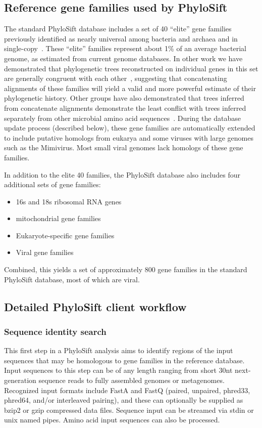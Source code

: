 \documentclass[10pt]{article}
\begin{document}
\subsection*{Reference gene families used by PhyloSift}

The standard PhyloSift database includes a set of 40 ``elite'' gene families previously identified as nearly universal among bacteria and archaea and in single-copy~\cite{DongyingWu2012}.
These ``elite'' families represent about 1\% of an average bacterial genome, as estimated from current genome databases.
In other work we have demonstrated that phylogenetic trees reconstructed on individual genes in this set are generally congruent with each other~\cite{Lang2012}, suggesting that concatenating alignments of these families will yield a valid and more powerful estimate of their phylogenetic history.
Other groups have also demonstrated that trees inferred from concatenate alignments demonstrate the least conflict with trees inferred separately from other microbial amino acid sequences~\cite{Abby2012}.
During the database update process (described below), these gene families are automatically extended to include putative homologs from eukarya and some viruses with large genomes such as the Mimivirus.
Most small viral genomes lack homologs of these gene families.

In addition to the elite 40 families, the PhyloSift database also includes four additional sets of gene families:
\begin{itemize}
\item 16s and 18s ribosomal {RNA} genes
\item mitochondrial gene families
\item Eukaryote-specific gene families
\item Viral gene families
\end{itemize}
Combined, this yields a set of approximately 800 gene families in the standard PhyloSift database, most of which are viral.

\subsection*{Detailed PhyloSift client workflow}
\subsubsection*{Sequence identity search}
This first step in a PhyloSift analysis aims to identify regions of the input sequences that may be homologous to gene families in the reference database.
Input sequences to this step can be of any length ranging from short 30nt next-generation sequence reads to fully assembled genomes or metagenomes.
Recognized input formats include FastA and FastQ (paired, unpaired, phred33, phred64, and/or interleaved pairing), and these can optionally be supplied as bzip2 or gzip compressed data files.
Sequence input can be streamed via stdin or unix named pipes.
Amino acid input sequences can also be processed.
\end{document}
